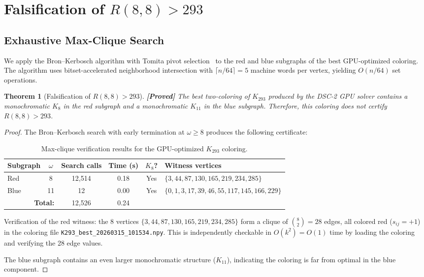 \documentclass[12pt,a4paper]{article}
\newcommand{\proved}[1]{\textcolor{proved}{\textbf{[Proved]}} #1}
\newtheorem{theorem}{Theorem}[section]
\theoremstyle{definition}
\theoremstyle{remark}
\newcommand{\Ramsey}[2]{R(#1,#2)}
\newcommand{\Kn}[1]{K_{#1}}
\begin{document}
\section{Falsification of $R(8,8) > 293$}
\label{sec:falsification}

\subsection{Exhaustive Max-Clique Search}

We apply the Bron--Kerbosch algorithm with Tomita pivot selection~\cite{Tomita2006} to the red and blue subgraphs of the best GPU-optimized coloring.  The algorithm uses bitset-accelerated neighborhood intersection with $\lceil n / 64 \rceil = 5$ machine words per vertex, yielding $O(n/64)$ set operations.

\begin{theorem}[Falsification of $\Ramsey{8}{8} > 293$]
\label{thm:falsification}
\proved{The best two-coloring of $\Kn{293}$ produced by the DSC-2 GPU solver contains a monochromatic $K_8$ in the red subgraph and a monochromatic $K_{11}$ in the blue subgraph.  Therefore, this coloring does not certify $\Ramsey{8}{8} > 293$.}
\end{theorem}

\begin{proof}
The Bron--Kerbosch search with early termination at $\omega \ge 8$ produces the following certificate:

\begin{table}[H]
\centering
\caption{Max-clique verification results for the GPU-optimized $\Kn{293}$ coloring.}
\label{tab:falsification}
\begin{tabular}{@{}lccccl@{}}
\toprule
\textbf{Subgraph} & $\omega$ & \textbf{Search calls} & \textbf{Time (s)} & \textbf{$K_8$?} & \textbf{Witness vertices} \\
\midrule
Red & 8 & 12{,}514 & 0.18 & Yes & $\{3, 44, 87, 130, 165, 219, 234, 285\}$ \\
Blue & 11 & 12 & 0.00 & Yes & $\{0, 1, 3, 17, 39, 46, 55, 117, 145, 166, 229\}$ \\
\midrule
\multicolumn{2}{r}{\textbf{Total:}} & 12{,}526 & 0.24 & & \\
\bottomrule
\end{tabular}
\end{table}

\noindent Verification of the red witness: the 8 vertices $\{3, 44, 87, 130, 165, 219, 234, 285\}$ form a clique of $\binom{8}{2} = 28$ edges, all colored red ($s_{ij} = +1$) in the coloring file \texttt{K293\_best\_20260315\_101534.npy}.  This is independently checkable in $O(k^2) = O(1)$ time by loading the coloring and verifying the 28 edge values.

\noindent The blue subgraph contains an even larger monochromatic structure ($K_{11}$), indicating the coloring is far from optimal in the blue component.
\end{proof}
\end{document}
